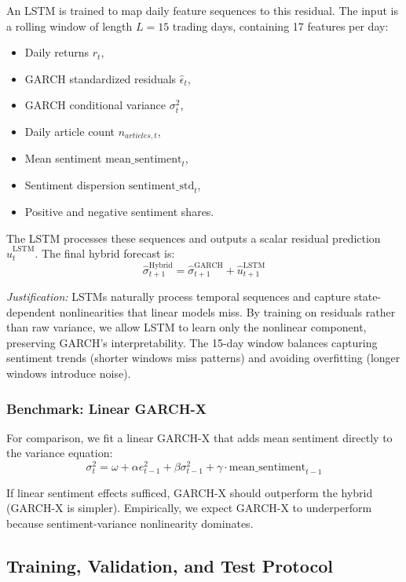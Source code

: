 An LSTM is trained to map daily feature sequences to this residual. The input is a rolling window of length $L = 15$ trading days, containing 17 features per day:
\begin{itemize}
    \item Daily returns $r_t$,
    \item GARCH standardized residuals $\hat{\epsilon}_t$,
    \item GARCH conditional variance $\sigma_t^2$,
    \item Daily article count $n_{articles, t}$,
    \item Mean sentiment $\text{mean\_sentiment}_t$,
    \item Sentiment dispersion $\text{sentiment\_std}_t$,
    \item Positive and negative sentiment shares.
\end{itemize}

The LSTM processes these sequences and outputs a scalar residual prediction $\hat{u}_t^{\text{LSTM}}$. The final hybrid forecast is:
$$\hat{\sigma}_{t+1}^{\text{Hybrid}} = \hat{\sigma}_{t+1}^{\text{GARCH}} + \hat{u}_{t+1}^{\text{LSTM}}$$

\textit{Justification:} LSTMs naturally process temporal sequences and capture state-dependent nonlinearities that linear models miss. By training on residuals rather than raw variance, we allow LSTM to learn only the nonlinear component, preserving GARCH's interpretability. The 15-day window balances capturing sentiment trends (shorter windows miss patterns) and avoiding overfitting (longer windows introduce noise).

\subsubsection{Benchmark: Linear GARCH-X}

For comparison, we fit a linear GARCH-X that adds mean sentiment directly to the variance equation:
$$\sigma_t^2 = \omega + \alpha e_{t-1}^2 + \beta \sigma_{t-1}^2 + \gamma \cdot \text{mean\_sentiment}_{t-1}$$

If linear sentiment effects sufficed, GARCH-X should outperform the hybrid (GARCH-X is simpler). Empirically, we expect GARCH-X to underperform because sentiment-variance nonlinearity dominates.

\subsection{Training, Validation, and Test Protocol}

